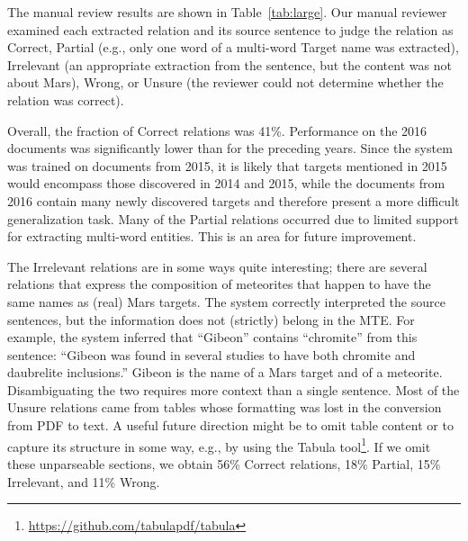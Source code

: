 \documentclass[letterpaper]{article} %
\begin{document}
The manual review results are shown in Table~\ref{tab:large}.  Our
manual reviewer examined each extracted relation and its source
sentence to judge the relation as Correct, Partial (e.g., only one
word of a multi-word Target name was extracted), Irrelevant (an
appropriate 
extraction from the sentence, but the content was not about Mars),
Wrong, or Unsure (the reviewer could not determine whether the
relation was correct).

Overall, the fraction of Correct relations was 41\%.  Performance on
the 2016 documents was significantly lower than for the preceding
years.  Since the system was trained on documents from 2015, it is
likely that targets mentioned in 2015 would encompass those discovered
in 2014 and 2015, while the documents from 2016 contain many newly
discovered targets and therefore present a more difficult
generalization task.
%
Many of the Partial relations occurred due to limited support for
extracting multi-word entities.  This is an area for future
improvement.

The Irrelevant relations are in some ways quite interesting;
there are several relations that express the composition of meteorites
that happen to have the same names as (real) Mars targets.  The system
correctly interpreted the source sentences, but the information does
not (strictly) belong in the MTE. 
For example, the system inferred that ``Gibeon'' contains ``chromite''
from this sentence: 
``Gibeon was found in several studies to have both chromite and
daubrelite inclusions.''
Gibeon is the name of a Mars target and of a meteorite.
Disambiguating the two requires more context than a single sentence.
%
Most of the Unsure relations came from tables whose formatting was
lost in the conversion from PDF to text.  A useful future direction
might be to omit table content or to capture its structure in some
way, e.g., by using the Tabula
tool\footnote{\url{https://github.com/tabulapdf/tabula}}.  If we omit
these unparseable sections, we obtain 56\% Correct 
relations, 18\% Partial, 15\% Irrelevant, and 11\% Wrong.
\end{document}
